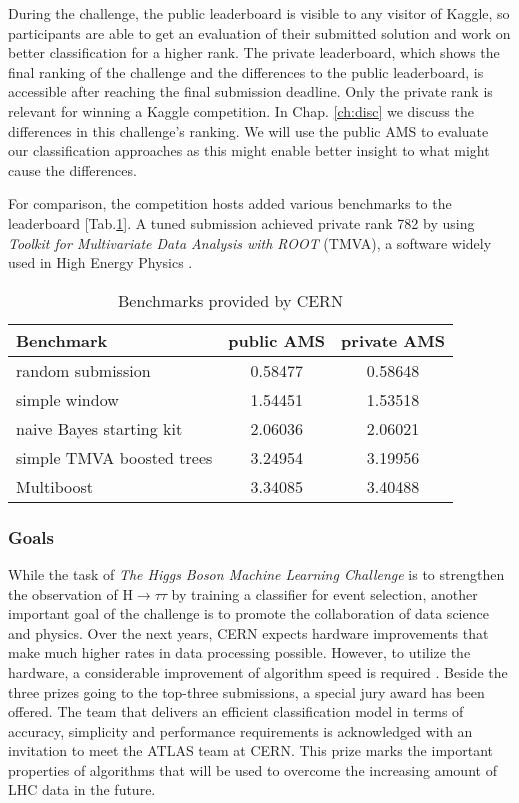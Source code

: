 During the challenge, the public leaderboard is visible to any visitor of Kaggle, so participants are able to get an evaluation of their submitted solution and work on better classification for a higher rank.
The private leaderboard, which shows the final ranking of the challenge and the differences to the public leaderboard, is accessible after reaching the final submission deadline. Only the private rank is relevant for winning a Kaggle competition. In Chap. \ref{ch:disc} we discuss the differences in this challenge's ranking. We will use the public AMS to evaluate our classification approaches as this might enable better insight to what might cause the differences.

For comparison, the competition hosts added various benchmarks to the leaderboard [Tab.\ref{tab:benchmarks}]. A tuned submission achieved private rank 782 by using \emph{Toolkit for Multivariate Data Analysis with ROOT} (TMVA), a software widely used in High Energy Physics \cite{cowa14}.
\begin{table}
	\begin{center}
		\begin{tabular}{ | l | c | c | }
		    \hline
		    Benchmark & public AMS & private AMS \\
		    \hline
	    	random submission & 0.58477 & 0.58648 \\
		    \hline
		    simple window & 1.54451 & 1.53518\\
		    \hline
		    naive Bayes starting kit & 2.06036 & 2.06021 \\
		    \hline
		    simple TMVA boosted trees & 3.24954 &  3.19956 \\
		    \hline
		    Multiboost & 3.34085 &  3.40488 \\
		    \hline
		\end{tabular}
		\caption{Benchmarks provided by CERN}
		\label{tab:benchmarks}
	\end{center}
\end{table}

\subsubsection{Goals}
While the task of \emph{The Higgs Boson Machine Learning Challenge} is to strengthen the observation of $\mathrm{H}\rightarrow\tau\tau $ by training a classifier for event selection, another important goal of the challenge is to promote the collaboration of data science and physics. Over the next years, CERN expects hardware improvements that make much higher rates in data processing possible. However, to utilize the hardware, a considerable improvement of algorithm speed is required \cite{glig14}.
Beside the three prizes going to the top-three submissions, a special jury award has been offered. The team that delivers an efficient classification model in terms of accuracy, simplicity and performance requirements is acknowledged with an invitation to meet the ATLAS team at CERN.
This prize marks the important properties of algorithms that will be used to overcome the increasing amount of LHC data in the future.

